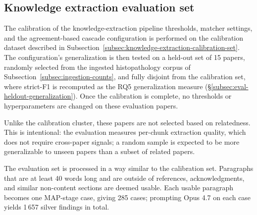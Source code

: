 \subsection{Knowledge extraction evaluation set}\label{subsec:knowledge-extraction-eval-set}

The calibration of the knowledge-extraction pipeline thresholds, matcher settings, and the agreement-based cascade configuration is performed on the calibration dataset described in Subsection~\ref{subsec:knowledge-extraction-calibration-set}. The configuration's generalization is then tested on a held-out set of 15 papers, randomly selected from the ingested histopathology corpus of Subsection~\ref{subsec:ingestion-counts}, and fully disjoint from the calibration set, where strict-F1 is recomputed as the RQ5 generalization measure (§\ref{subsec:eval-heldout-generalization}). Once the calibration is complete, no thresholds or hyperparameters are changed on these evaluation papers. 

Unlike the calibration cluster, these papers are not selected based on relatedness. This is intentional: the evaluation measures per-chunk extraction quality, which does not require cross-paper signals; a random sample is expected to be more generalizable to unseen papers than a subset of related papers.

The evaluation set is processed in a way similar to the calibration set. Paragraphs that are at least 40 words long and are outside of references, acknowledgments, and similar non-content sections are deemed usable. Each usable paragraph becomes one MAP-stage case, giving 285 cases; prompting Opus 4.7 on each case yields 1\,657 silver findings in total.